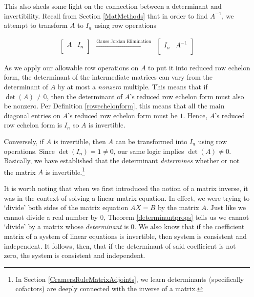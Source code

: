 \documentclass{ximera}
\begin{document}
This also sheds some light on the connection between a determinant and invertibility.  Recall from Section \ref{MatMethods} that in order to find $A^{-1}$, we attempt to transform $A$ to $I_{n}$ using row operations

\[ \begin{array}{ccc}

\left[ \begin{array}{c|c} A & I_{n} \\ \end{array} \right]

&
\xrightarrow{\text{Gauss Jordan Elimination}}

&

\left[ \begin{array}{c|c} I_{n} & A^{-1} \\ \end{array} \right] 

\end{array}\]

As we apply our allowable row operations on $A$ to put it into reduced row echelon form, the determinant of the intermediate matrices can vary from the determinant of $A$ by at most a \textit{nonzero} multiple.  This means that if $\det(A) \neq 0$, then the determinant of $A$'s reduced row echelon form must also be nonzero.   Per  Definition \ref{rowechelonform}, this  means that all the main diagonal entries on $A$'s reduced row echelon form must be $1$.  Hence,  $A$'s reduced row echelon form is $I_{n}$ so  $A$ is invertible. 

Conversely, if $A$ is invertible, then $A$ can be transformed into $I_{n}$ using row operations.  Since $\det\left(I_{n}\right) = 1 \neq 0$, our same logic implies $\det(A) \neq 0$. Basically, we have established that the determinant \textit{determines} whether or not the matrix $A$ is invertible.\footnote{In Section \ref{CramersRuleMatrixAdjoints}, we learn determinants (specifically cofactors) are deeply connected with the inverse of a matrix.}  

\smallskip

It is worth noting that when we first introduced the notion of a matrix inverse, it was in the context of solving a linear matrix equation.  In effect, we were trying to `divide' both sides of the matrix equation $AX = B$ by the matrix $A$.  Just like we cannot divide a real number by $0$, Theorem \ref{determinantprops} tells us we cannot `divide' by a matrix whose \textit{determinant} is $0$.  We also know that if the coefficient matrix of a system of linear equations is invertible, then system is consistent and independent.  It follows, then, that if the determinant of said coefficient is not zero, the system is consistent and independent.  
\end{document}
